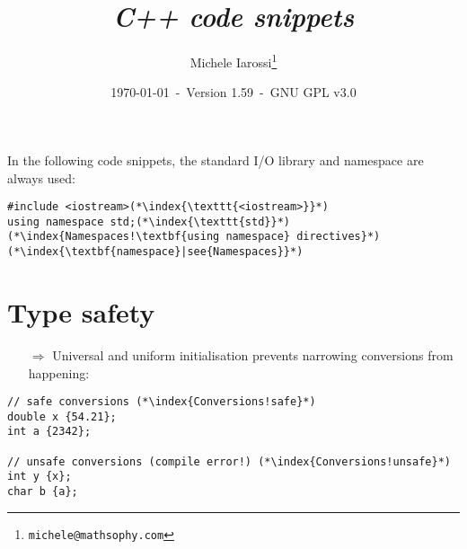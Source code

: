 \documentclass[10pt]{article}
\begin{document}
\title{\emph{C++ code snippets}}
\author{Michele Iarossi\thanks{\texttt{michele@mathsophy.com}}}
\date{\small \today~-~Version 1.59~-~GNU GPL v3.0}


\maketitle

\small

\begin{frame}{}
\setlength\columnsep{1cm}
\begin{multicols}{2}
\tableofcontents
\end{multicols}
\end{frame}

\noindent
In the following code snippets, the standard I/O library and namespace are always used:
\begin{lstlisting}
#include <iostream>(*\index{\texttt{<iostream>}}*)
using namespace std;(*\index{\texttt{std}}*)(*\index{Namespaces!\textbf{using namespace} directives}*)(*\index{\textbf{namespace}|see{Namespaces}}*)
\end{lstlisting}

\newpage
%
%
\section{Type safety}
\small
\begin{enumerate}
\item[$\Rightarrow$] Universal and uniform initialisation prevents narrowing conversions from happening:
\end{enumerate}
\begin{lstlisting}
// safe conversions (*\index{Conversions!safe}*)
double x {54.21};
int a {2342};

// unsafe conversions (compile error!) (*\index{Conversions!unsafe}*)
int y {x};
char b {a};
\end{lstlisting}
%
%
\end{document}
